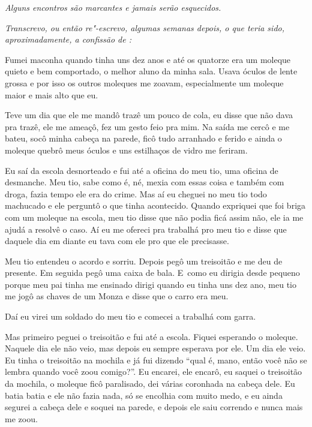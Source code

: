  

\emph{Alguns encontros são marcantes e jamais serão esquecidos.}~

\emph{Transcrevo, ou então re"-escrevo, algumas semanas depois, o que
teria sido, aproximadamente, a confissão de :}

\bigskip{} 

Fumei maconha quando tinha uns dez anos e até os quatorze era um moleque
quieto e bem comportado, o melhor aluno da minha sala. Usava óculos de
lente grossa e por isso os outros moleques me zoavam, especialmente um
moleque maior e mais alto que eu.

Teve um dia que ele me mandô trazê um pouco de cola, eu disse que não
dava pra trazê, ele me ameaçô, fez um gesto feio pra mim. Na saída me
cercô e me bateu, socô minha cabeça na parede, ficô tudo arranhado e
ferido e ainda o moleque quebrô meus óculos e uns estilhaços de vidro me
feriram.

Eu saí da escola desnorteado e fui até a oficina do meu tio, uma oficina
de desmanche. Meu tio, sabe como é, né, mexia com essas coisa e também
com droga, fazia tempo ele era do crime. Mas aí eu cheguei no meu tio
todo machucado e ele perguntô o que tinha acontecido. Quando expriquei
que foi briga com um moleque na escola, meu tio disse que não podia ficá
assim não, ele ia me ajudá a resolvê o caso. Aí eu me ofereci pra
trabalhá pro meu tio e disse que daquele dia em diante eu tava com ele
pro que ele precisasse.

Meu tio entendeu o acordo e sorriu. Depois pegô um treisoitão e me deu
de presente. Em seguida pegô uma caixa de bala. E~como eu dirigia desde
pequeno porque meu pai tinha me ensinado dirigi quando eu tinha uns dez
ano, meu tio me jogô as chaves de um Monza e disse que o carro era meu.

Daí eu virei um soldado do meu tio e comecei a trabalhá com garra.

Mas primeiro peguei o treisoitão e fui até a escola. Fiquei esperando o
moleque. Naquele dia ele não veio, mas depois eu sempre esperava por
ele. Um dia ele veio. Eu tinha o treisoitão na mochila e já fui dizendo
``qual é, mano, então você não se lembra quando você zoou comigo?''. Eu
encarei, ele encarô, eu saquei o treisoitão da mochila, o moleque ficô
paralisado, dei várias coronhada na cabeça dele. Eu batia batia e ele
não fazia nada, só se encolhia com muito medo, e eu ainda segurei a
cabeça dele e soquei na parede, e depois ele saiu correndo e nunca mais
me zoou.

